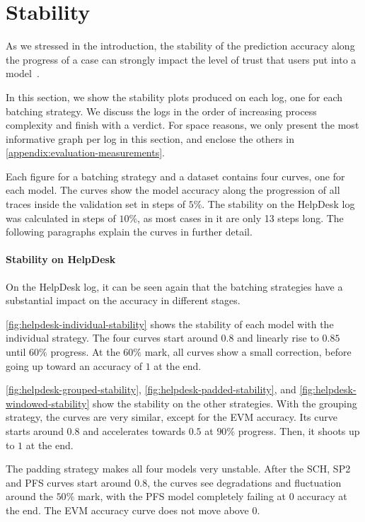 \section{Stability}\label{sec:eval:stability}
As we stressed in the introduction, the stability of the prediction accuracy along the progress of a case can strongly impact the level of trust that users put into a model~\cite{metzger2015}.

In this section, we show the stability plots produced on each log, one for each batching strategy.
We discuss the logs in the order of increasing process complexity and finish with a verdict.
For space reasons, we only present the most informative graph per log in this section, and enclose the others in \autoref{appendix:evaluation-measurements}.

Each figure for a batching strategy and a dataset contains four curves, one for each model.
The curves show the model accuracy along the progression of all traces inside the validation set in steps of $5\%$.
The stability on the HelpDesk log was calculated in steps of $10\%$, as most cases in it are only 13 steps long.
The following paragraphs explain the curves in further detail.

\paragraph{Stability on HelpDesk}
On the HelpDesk log, it can be seen again that the batching strategies have a substantial impact on the accuracy in different stages.

\autoref{fig:helpdesk-individual-stability} shows the stability of each model with the individual strategy.
The four curves start around $0.8$ and linearly rise to $0.85$ until $60\%$ progress.
At the $60\%$ mark, all curves show a small correction, before going up toward an accuracy of $1$ at the end.

\autoref{fig:helpdesk-grouped-stability}, \autoref{fig:helpdesk-padded-stability}, and \autoref{fig:helpdesk-windowed-stability} show the stability on the other strategies.
With the grouping strategy, the curves are very similar, except for the EVM accuracy.
Its curve starts around $0.8$ and accelerates towards $0.5$ at $90\%$ progress.
Then, it shoots up to $1$ at the end.

The padding strategy makes all four models very unstable.
After the SCH, SP2 and PFS curves start around $0.8$, the curves see degradations and fluctuation around the $50\%$ mark, with the PFS model completely failing at $0$ accuracy at the end.
The EVM accuracy curve does not move above $0$.

